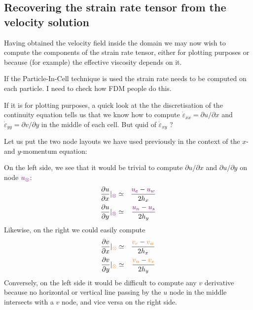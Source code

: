 \newpage
\subsection{Recovering the strain rate tensor from the velocity solution}

Having obtained the velocity field inside the domain we may now 
wish to compute the components of the strain rate tensor, either
for plotting purposes or because (for example) the effective viscosity 
depends on it.

If the Particle-In-Cell technique is used the strain rate needs to 
be computed on each particle. 
{\color{red} I need to check how FDM people do this.}

If it is for plotting purposes, a quick look 
at the the discretisation of the continuity equation tells us that
we know how to compute 
$\dot{\varepsilon}_{xx}=\partial u/ \partial x$ and
$\dot{\varepsilon}_{yy}=\partial v/ \partial y$ in the middle of each cell. 
But quid of $\dot{\varepsilon}_{xy}$ ?

Let us put the two node layouts we have used previously 
in the context of the $x$- and $y$-momentum equation:

\begin{multicols}{2}



\columnbreak



\end{multicols}

On the left side, we see that it would be trivial to compute $\partial u/\partial x$
and $\partial u/\partial y$ on node ${\color{violet} u_\otimes}$:
\begin{eqnarray}
\frac{\partial u}{\partial x} |_{\color{violet}\otimes}
&\simeq&  \frac{ {\color{violet} u_e}-{\color{violet} u_w}  }{2h_x} \nonumber\\
\frac{\partial u}{\partial y} |_{\color{violet}\otimes}
&\simeq&  \frac{ {\color{violet} u_n}-{\color{violet} u_s}  }{2h_y} \nonumber
\end{eqnarray}
Likewise, on the right we could easily compute
\begin{eqnarray}
\frac{\partial v}{\partial x} |_{\color{orange}\otimes}
&\simeq&  \frac{ {\color{orange} v_e}-{\color{orange} v_w}  }{2h_x} \nonumber\\
\frac{\partial v}{\partial y} |_{\color{orange}\otimes}
&\simeq&  \frac{ {\color{orange} v_n}-{\color{orange} v_s}  }{2h_y} \nonumber
\end{eqnarray}
Conversely, on the left side it would be difficult to 
compute any $v$ derivative because no horizontal or vertical 
line passing by the $u$ node in the middle intersects with a 
$v$ node, and vice versa on the right side. 

